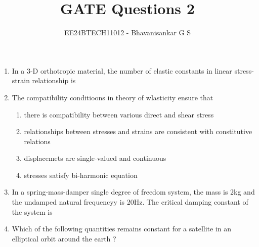 \documentclass[journal,12pt,onecolumn]{IEEEtran}
\theoremstyle{remark}
\begin{document}

\vspace{3cm}

\title{GATE Questions 2}
\author{EE24BTECH11012 - Bhavanisankar G S}
\maketitle
\newpage
\bigskip

\renewcommand{\thefigure}{\theenumi}
\renewcommand{\thetable}{\theenumi}
\begin{enumerate}
	\item In a 3-D orthotropic material, the number of elastic constants in linear stress-strain relationship is
		\begin{enumerate}
		\end{enumerate}
	\item The compatibility conditioons in theory of wlasticity ensure that
		\begin{enumerate}
			\item there is compatibility between various direct and shear stress
			\item relationships between stresses and strains are consistent with constitutive relations
			\item displacemets are single-valued and continuous
			\item stresses satisfy bi-harmonic equation
		\end{enumerate}
	\item In a spring-mass-damper single degree of freedom system, the mass is 2kg and the undamped natural frequencyy is 20Hz. The critical damping constant of the system is
		\begin{enumerate}
		\end{enumerate}
	\item Which of the following quantities remains constant for a satellite in an elliptical orbit around the earth ?

\end{enumerate}
\end{document}
